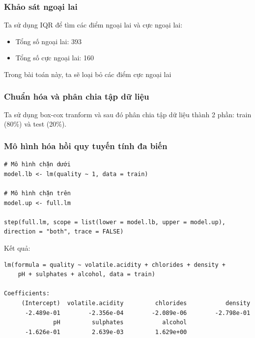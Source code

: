 \subsubsection{Khảo sát ngoại lai}

Ta sử dụng IQR để tìm các điểm ngoại lai và cực ngoại lai:
\begin{itemize}
    \item Tổng số ngoại lai: 393
    \item Tổng số cực ngoại lai: 160
\end{itemize}
Trong bài toán này, ta sẽ loại bỏ các điểm cực ngoại lai

\subsubsection{Chuẩn hóa và phân chia tập dữ liệu}

Ta sử dụng box-cox tranform và sau đó phân chia tập dữ liệu thành 2 phần: train (80\%) và test (20\%).

\subsubsection{Mô hình hóa hồi quy tuyến tính đa biến}

\begin{lstlisting}
# Mô hình chặn dưới
model.lb <- lm(quality ~ 1, data = train)

# Mô hình chặn trên
model.up <- full.lm

step(full.lm, scope = list(lower = model.lb, upper = model.up), direction = "both", trace = FALSE)
\end{lstlisting}
Kết quả:
\begin{lstlisting}
lm(formula = quality ~ volatile.acidity + chlorides + density + 
    pH + sulphates + alcohol, data = train)

Coefficients:
     (Intercept)  volatile.acidity         chlorides           density  
      -2.489e-01        -2.356e-04        -2.089e-06        -2.798e-01  
              pH         sulphates           alcohol  
      -1.626e-01         2.639e-03         1.629e+00 
\end{lstlisting}

